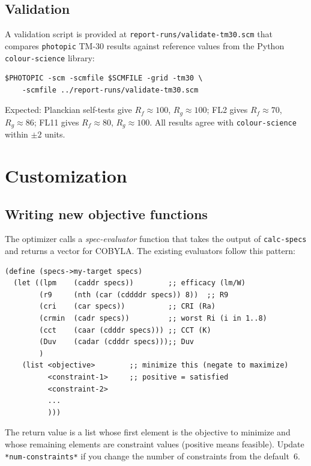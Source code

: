 \documentclass[11pt]{article}
\newcommand{\photopic}{\texttt{photopic}}
\newcommand{\cmd}[1]{\texttt{#1}}
\newcommand{\file}[1]{\texttt{#1}}
\begin{document}
\subsection{Validation}

A validation script is provided at \file{report-runs/validate-tm30.scm}
that compares \photopic{} TM-30 results against reference values from
the Python \texttt{colour-science} library:

\begin{lstlisting}[style=shell]
$PHOTOPIC -scm -scmfile $SCMFILE -grid -tm30 \
    -scmfile ../report-runs/validate-tm30.scm
\end{lstlisting}

Expected: Planckian self-tests give $R_f \approx 100$, $R_g \approx 100$;
FL2 gives $R_f \approx 70$, $R_g \approx 86$; FL11 gives
$R_f \approx 80$, $R_g \approx 100$.  All results agree with
\texttt{colour-science} within $\pm 2$ units.

\section{Customization}
\label{sec:customization}

\subsection{Writing new objective functions}

The optimizer calls a \emph{spec-evaluator} function that takes the
output of \cmd{calc-specs} and returns a vector for COBYLA.
The existing evaluators follow this pattern:

\begin{lstlisting}[style=scheme]
(define (specs->my-target specs)
  (let ((lpm    (caddr specs))        ;; efficacy (lm/W)
        (r9     (nth (car (cddddr specs)) 8))  ;; R9
        (cri    (car specs))          ;; CRI (Ra)
        (crmin  (cadr specs))         ;; worst Ri (i in 1..8)
        (cct    (caar (cdddr specs))) ;; CCT (K)
        (Duv    (cadar (cdddr specs)));; Duv
        )
    (list <objective>        ;; minimize this (negate to maximize)
          <constraint-1>     ;; positive = satisfied
          <constraint-2>
          ...
          )))
\end{lstlisting}

The return value is a list whose first element is the objective to
minimize and whose remaining elements are constraint values (positive
means feasible).  Update \cmd{*num-constraints*} if you change the
number of constraints from the default~6.
\end{document}
